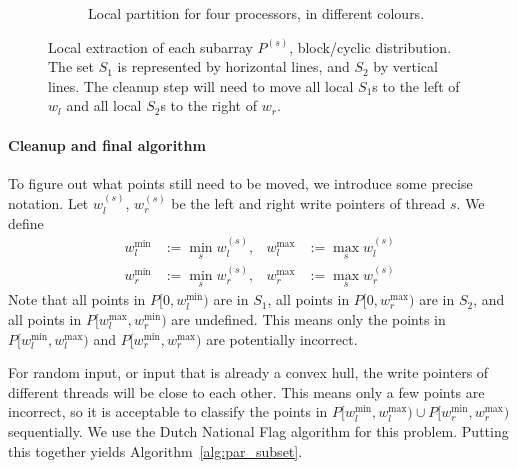 \begin{figure}[ht]
\begin{subfigure}[b]{\linewidth}
{%
    }%
    \caption{Local partition for four processors, in different colours.}
  \end{subfigure}%
  \caption{Local extraction of each subarray $P^{(s)}$, block\-/cyclic distribution.
  The set $S_1$ is represented by horizontal lines, and $S_2$ by vertical lines.
  The cleanup step will need to move all local $S_1$s to the left of $w_l$ and all local $S_2$s to the right of $w_r$.}%
  \label{fig:blockcyclic}%
\end{figure}

\paragraph{Cleanup and final algorithm}
To figure out what points still need to be moved, we introduce some precise notation.
Let $w_l^{(s)}$, $w_r^{(s)}$ be the left and right write pointers of thread $s$.
We define
\begin{align*}
  w_l^{\min} &:= \min_{s} w_l^{(s)}, & w_l^{\max} &:= \max_{s} w_l^{(s)} \\
  w_r^{\min} &:= \min_{s} w_r^{(s)}, & w_r^{\max} &:= \max_{s} w_r^{(s)}
\end{align*}
Note that all points in $P[0, w_l^{\min})$ are in $S_1$, all points in $P[0, w_r^{\max})$ are in $S_2$, and all points in $P[w_l^{\max}, w_r^{\min})$ are undefined.
This means only the points in $P[w_l^{\min}, w_l^{\max})$ and $P[w_r^{\min}, w_r^{\max})$ are potentially incorrect.

For random input, or input that is already a convex hull, the write pointers of different threads will be close to each other.
This means only a few points are incorrect, so it is acceptable to classify the points in $P[w_l^{\min}, w_l^{\max}) \cup P[w_r^{\min}, w_r^{\max})$ sequentially.
We use the Dutch National Flag algorithm for this problem.
Putting this together yields Algorithm~\ref{alg:par_subset}.


